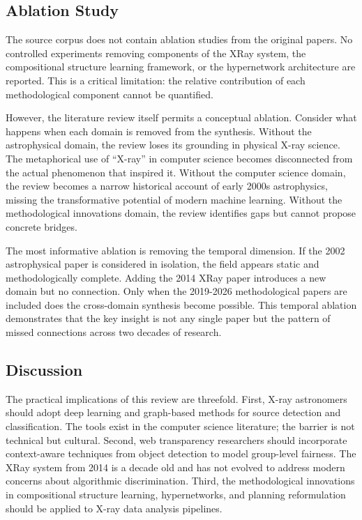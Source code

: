 \documentclass[conference]{IEEEtran}
\begin{document}
\subsection{Ablation Study}

The source corpus does not contain ablation studies from the original papers. No controlled experiments removing components of the XRay system, the compositional structure learning framework, or the hypernetwork architecture are reported. This is a critical limitation: the relative contribution of each methodological component cannot be quantified.

However, the literature review itself permits a conceptual ablation. Consider what happens when each domain is removed from the synthesis. Without the astrophysical domain, the review loses its grounding in physical X-ray science. The metaphorical use of ``X-ray'' in computer science becomes disconnected from the actual phenomenon that inspired it. Without the computer science domain, the review becomes a narrow historical account of early 2000s astrophysics, missing the transformative potential of modern machine learning. Without the methodological innovations domain, the review identifies gaps but cannot propose concrete bridges.

The most informative ablation is removing the temporal dimension. If the 2002 astrophysical paper \cite{r1} is considered in isolation, the field appears static and methodologically complete. Adding the 2014 XRay paper \cite{r3} introduces a new domain but no connection. Only when the 2019-2026 methodological papers \cite{r4,r5,r7,r8,r9,r10} are included does the cross-domain synthesis become possible. This temporal ablation demonstrates that the key insight is not any single paper but the pattern of missed connections across two decades of research.

\subsection{Discussion}

The practical implications of this review are threefold. First, X-ray astronomers should adopt deep learning and graph-based methods for source detection and classification. The tools exist in the computer science literature; the barrier is not technical but cultural. Second, web transparency researchers should incorporate context-aware techniques from object detection to model group-level fairness. The XRay system from 2014 \cite{r3} is a decade old and has not evolved to address modern concerns about algorithmic discrimination. Third, the methodological innovations in compositional structure learning, hypernetworks, and planning reformulation should be applied to X-ray data analysis pipelines.
\end{document}
